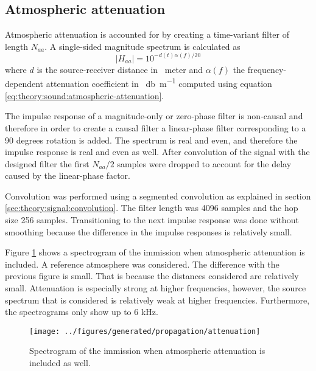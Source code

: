 \newpage
\subsection{Atmospheric attenuation} %
Atmospheric attenuation is accounted for by creating a time-variant filter of length $N_{aa}$.
A single-sided magnitude spectrum is calculated as
\begin{equation}
 \left| H_{aa} \right| = 10^{- d(t) \alpha(f) / 20}
\end{equation}
where $d$ is the source-receiver distance in \SI{}{meter} and $\alpha(f)$ the
frequency-dependent attenuation coefficient in \SI{}{\decibel\per\meter} computed using
equation \eqref{eq:theory:sound:atmospheric-attenuation}.

The impulse response of a magnitude-only or zero-phase filter is non-causal and therefore in
order to create a causal filter a linear-phase filter corresponding to a 90
degrees rotation is added. The spectrum is real and even, and therefore the impulse
response is real and even as well. After convolution of the signal with the designed
filter the first $N_{aa}/2$ samples were dropped to account for the delay caused
by the linear-phase factor.

Convolution was performed using a segmented convolution as explained in section
\ref{sec:theory:signal:convolution}. The filter length was 4096 samples and the
hop size 256 samples. Transitioning to the next impulse response was done
without smoothing because the difference in the impulse responses is relatively
small.

Figure \ref{fig:implementation:propagation:attenuation} shows a spectrogram of
the immission when atmospheric attenuation is included. A reference atmosphere
was considered. The difference with the previous figure is small. That is
because the distances considered are relatively small. Attenuation is especially
strong at higher frequencies, however, the source spectrum that is considered is
relatively weak at higher frequencies. Furthermore, the spectrograms only show up to
6 kHz.

\begin{figure}[H]
  \centering
  \texttt{[image: ../figures/generated/propagation/attenuation]}
  \caption{Spectrogram of the immission when atmospheric attenuation is included as well.}
  \label{fig:implementation:propagation:attenuation}
\end{figure}

